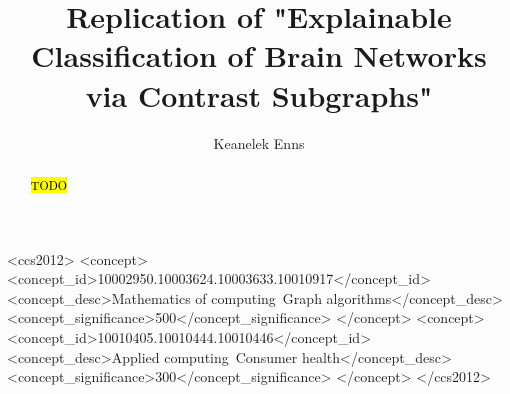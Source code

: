 \documentclass[sigconf]{acmart}
\begin{document}
\graphicspath{ {./img/} }


\title[Contrast Subgraphs of Brain Networks]{Replication of "Explainable Classification of Brain Networks via Contrast Subgraphs"}

\author{Keanelek Enns}


\renewcommand{\shortauthors}{K. Enns}

\begin{abstract}
\hl{TODO}
\end{abstract}

\begin{CCSXML}
<ccs2012>
   <concept>
       <concept_id>10002950.10003624.10003633.10010917</concept_id>
       <concept_desc>Mathematics of computing~Graph algorithms</concept_desc>
       <concept_significance>500</concept_significance>
       </concept>
   <concept>
       <concept_id>10010405.10010444.10010446</concept_id>
       <concept_desc>Applied computing~Consumer health</concept_desc>
       <concept_significance>300</concept_significance>
       </concept>
 </ccs2012>
\end{CCSXML}




\maketitle
\end{document}
